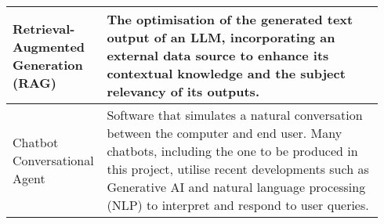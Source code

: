 \documentclass[12pt]{report}
\begin{document}
\begin{table}[H]
\begin{tabular}{|p{0.2\linewidth}|p{0.74\linewidth}|}
        Retrieval-Augmented Generation \newline (RAG) & The optimisation of the generated text output of an LLM, incorporating
        an external data source to enhance its contextual knowledge and the subject relevancy of its outputs. \\

        \hline
        Chatbot \newline Conversational Agent & Software that simulates a natural conversation between the 
        computer and end user. Many chatbots, including the one to be produced in this project, utilise recent
        developments such as Generative AI and natural language processing (NLP) to interpret and respond to user queries.
        \autocite{IBMChatbotDef}\\




        \hline 

    \end{tabular}
\end{table}

\tableofcontents
\thispagestyle{empty}



\footnotesize \listoffigures
\thispagestyle{empty}

\normalsize
 



    
     


     
     
     
\end{document}
